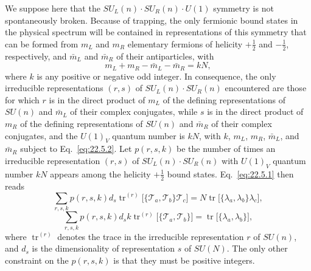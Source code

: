 We suppose here that the $SU_L(n)\cdot SU_R(n)\cdot U(1)$ symmetry is not
spontaneously broken. Because of trapping, the only fermionic bound states
in the physical spectrum will be contained in representations of this
symmetry that can be formed from $m_L$ and $m_R$ elementary fermions of
helicity $+\frac12$ and $-\frac12$, respectively, and $\bar m_L$ and
$\bar m_R$ of their antiparticles, with
\begin{equation}
 m_L+m_R-\bar m_L-\bar m_R=kN,
 \tag{22.5.2}\label{eq:22.5.2}
\end{equation}
where $k$ is any positive or negative odd integer. In consequence, the only
irreducible representations $(r,s)$ of $SU_L(n)\cdot SU_R(n)$ encountered
are those for which $r$ is in the direct product of $m_L$ of the defining
representations of $SU(n)$ and $\bar m_L$ of their complex conjugates,
while $s$ is in the direct product of $m_R$ of the defining representations
of $SU(n)$ and $\bar m_R$ of their complex conjugates, and the $U(1)_V$
quantum number is $kN$, with $k$, $m_L$, $m_R$, $\bar m_L$, and $\bar m_R$
subject to Eq.~\eqref{eq:22.5.2}. Let $p(r,s,k)$ be the number of times an
irreducible representation $(r,s)$ of $SU_L(n)\cdot SU_R(n)$ with $U(1)_V$
quantum number $kN$ appears among the helicity $+\frac12$ bound states.
Eq.~\eqref{eq:22.5.1} then reads
\begin{equation}
 \sum_{r,s,k}p(r,s,k)d_s
 \operatorname{tr}^{(r)}
 \bigl[\{\mathcal T_a,\mathcal T_b\}\mathcal T_c\bigr]
 =
 N\operatorname{tr}\bigl[\{\lambda_a,\lambda_b\}\lambda_c\bigr],
 \tag{22.5.3}\label{eq:22.5.3}
\end{equation}
\begin{equation}
 \sum_{r,s,k}p(r,s,k)d_s k
 \operatorname{tr}^{(r)}
 \bigl[\{\mathcal T_a,\mathcal T_b\}\bigr]
 =
 \operatorname{tr}\bigl[\{\lambda_a,\lambda_b\}\bigr],
 \tag{22.5.4}\label{eq:22.5.4}
\end{equation}
where $\operatorname{tr}^{(r)}$ denotes the trace in the irreducible
representation $r$ of $SU(n)$, and $d_s$ is the dimensionality of
representation $s$ of $SU(N)$. The only other constraint on the $p(r,s,k)$
is that they must be positive integers.


